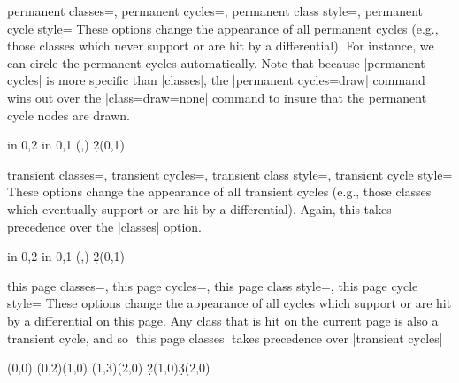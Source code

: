 \documentclass{ltxdoc}
\begin{document}
\begin{sseqdata}[name=ex1,degree={#1}{1-#1}]
\begin{keylist}{permanent classes=, permanent cycles=, permanent class style=, permanent cycle style=}
These options change the appearance of all permanent cycles (e.g., those classes which never support or are hit by a differential). For instance, we can circle the permanent cycles automatically. Note that because |permanent cycles| is more specific than |classes|, the |permanent cycles={draw}| command wins out over the |class={draw=none}| command to insure that the permanent cycle nodes are drawn.
\begin{codeexample}[]
\begin{sseqpage}[cohomological Serre grading,
                 classes={draw=none},permanent cycles={draw}]
\foreach \x in {0,2} \foreach \y in {0,1}{
    \class["$\mathbb{Z}$"](\x,\y)
}
\d2(0,1)
\end{sseqpage}
\end{codeexample}
\end{keylist}

\begin{keylist}{transient classes=, transient cycles=, transient class style=, transient cycle style=}
These options change the appearance of all transient cycles (e.g., those classes which eventually support or are hit by a differential). Again, this takes precedence over the |classes| option.
\begin{codeexample}[]
\begin{sseqpage}[cohomological Serre grading,
                 classes={draw=none}, transient cycles=red]
\foreach \x in {0,2} \foreach \y in {0,1}{
    \class["$\mathbb{Z}$"](\x,\y)
}
\d2(0,1)
\end{sseqpage}
\end{codeexample}
\end{keylist}

\begin{keylist}{this page classes=, this page cycles=, this page class style=, this page cycle style=}
These options change the appearance of all cycles which support or are hit by a differential on this page. Any class that is hit on the current page is also a transient cycle, and so |this page classes| takes precedence over |transient cycles|
\begin{codeexample}[width=6cm]
\begin{sseqdata}[name=this page cycles example,Adams grading,
                 transient cycles={red,fill},this page cycles={blue}]
\class(0,0)
\class(0,2)\class(1,0)
\class(1,3)\class(2,0)
\d2(1,0)\d3(2,0)
\end{sseqdata}
\printpage[name=this page cycles example,page=2]
\hskip1cm
\printpage[name=this page cycles example,page=3]
\end{codeexample}
\end{keylist}


\end{sseqdata}
\end{document}
